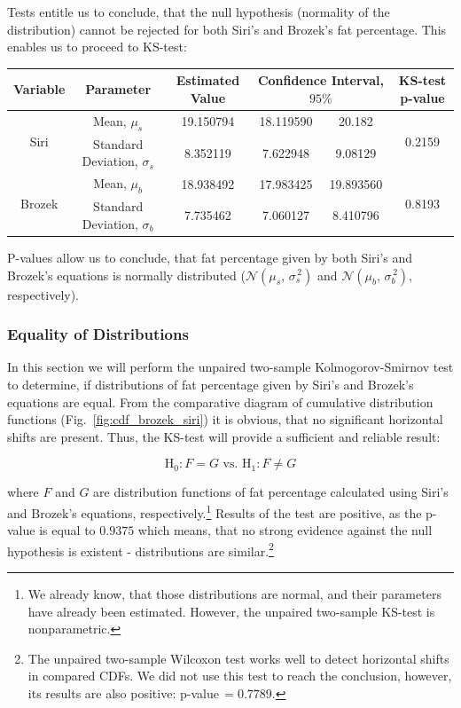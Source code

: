 \documentclass[11pt,american,american]{article}
\begin{document}
Tests entitle us to conclude, that the null hypothesis (normality of the distribution) cannot be rejected for both Siri's and Brozek's fat percentage. This enables us to proceed to KS-test:

\begin{table}[ht!]
	\centering
	\begin{tabular}{|c||c||c||c|c||c|}
		\hline 
		Variable & Parameter &  Estimated Value & \multicolumn{2}{c||}{Confidence Interval, $95\%$}  & KS-test p-value \\ 
		\hline \hline 
		\multirow{2}{*}{Siri} & Mean, $\mu_{s}$ & 19.150794 & 18.119590 &  20.182 & \multirow{2}{*}{0.2159} \\ 
		\cline{2-5}
		& Standard Deviation, $\sigma_{s}$ & 8.352119 & 7.622948 &  9.08129 & \\ 
		\hline \hline
		\multirow{2}{*}{Brozek} & Mean, $\mu_{b}$ & 18.938492 & 17.983425 &  19.893560 & \multirow{2}{*}{0.8193} \\ 
		\cline{2-5}
		& Standard Deviation, $\sigma_{b}$ & 7.735462 & 7.060127 &  8.410796 & \\ 
		\hline
	\end{tabular} 
\end{table}

P-values allow us to conclude, that fat percentage given by both Siri's and Brozek's equations is normally distributed ($\mathcal{N} (\mu_{s},\,\sigma^{\,2}_{s})$ and $\mathcal{N} (\mu_{b},\,\sigma^{\,2}_{b})$, respectively).

\subsubsection{Equality of Distributions}

In this section we will perform the unpaired two-sample Kolmogorov-Smirnov test to determine, if distributions of fat percentage given by Siri's and Brozek's equations are equal. From the comparative diagram of cumulative distribution functions (Fig.~\ref{fig:cdf_brozek_siri}) it is obvious, that no significant horizontal shifts are present. Thus, the KS-test will provide a sufficient and reliable result:

\begin{equation*}
	\text{H}_{0}: F=G \text{ vs. }
	\text{H}_{1}: F \neq G
\end{equation*}

\medskip
\noindent
where $F$ and $G$ are distribution functions of fat percentage calculated using Siri's and Brozek's equations, respectively.\footnote{We already know, that those distributions are normal, and their parameters have already been estimated. However, the unpaired two-sample KS-test is nonparametric.} Results of the test are positive, as the p-value is equal to $0.9375$ which means, that no strong evidence against the null hypothesis is existent - distributions are similar.\footnote{The unpaired two-sample Wilcoxon test works well to detect horizontal shifts in compared CDFs. We did not use this test to reach the conclusion, however, its results are also positive: p-value$\,=0.7789$.}
\end{document}
